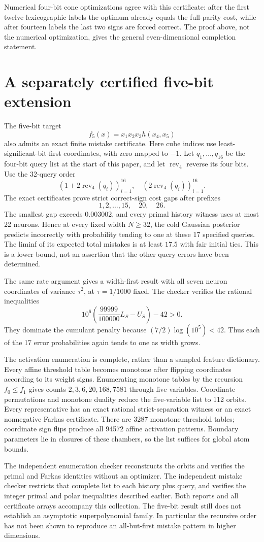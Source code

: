\documentclass[11pt]{article}
\begin{document}
Numerical four-bit cone optimizations agree with this certificate: after
the first twelve lexicographic labels the optimum already equals the
full-parity cost, while after fourteen labels the last two signs are
forced correct. The proof above, not the numerical optimization, gives
the general even-dimensional completion statement.

\section{A separately certified five-bit extension}
The five-bit target
\[
 f_5(x)=x_1x_2x_3h(x_4,x_5)
\]
also admits an exact finite mistake certificate. Here cube indices use
least-significant-bit-first coordinates, with zero mapped to $-1$.
Let $q_1,\ldots,q_{16}$ be the four-bit query list at the start of this
paper, and let $\operatorname{rev}_4$ reverse its four bits. Use the
32-query order
\[
 (1+2\operatorname{rev}_4(q_i))_{i=1}^{16},\quad
 (2\operatorname{rev}_4(q_i))_{i=1}^{16}.
\]
The exact certificates prove strict correct-sign cost gaps after
prefixes
\[
                  1,2,\ldots,15,\quad20,\quad26.
\]
The smallest gap exceeds $0.003002$, and every primal history witness
uses at most 22 neurons. Hence at every fixed width $N\ge32$, the
cold Gaussian posterior predicts incorrectly with probability tending
to one at these 17 specified queries. The liminf of its expected total
mistakes is at least $17.5$ with fair initial ties. This is a lower
bound, not an assertion that the other query errors have been determined.

The same rate argument gives a width-first result with all seven neuron
coordinates of variance $\tau^2$, at $\tau=1/1000$ fixed. The checker
verifies the rational inequalities
\[
 10^6\left(\frac{99999}{100000}L_S-U_S\right)-42>0.
\]
They dominate the cumulant penalty because
$(7/2)\log(10^5)<42$. Thus each of the 17 error probabilities again
tends to one as width grows.

The activation enumeration is complete, rather than a sampled feature
dictionary. Every affine threshold table becomes monotone after flipping
coordinates according to its weight signs. Enumerating monotone tables
by the recursion $f_0\le f_1$ gives counts
$2,3,6,20,168,7581$ through five variables. Coordinate permutations
and monotone duality reduce the five-variable list to 112 orbits.
Every representative has an exact rational strict-separation witness
or an exact nonnegative Farkas certificate. There are 3287 monotone
threshold tables; coordinate sign flips produce all 94572 affine
activation patterns. Boundary parameters lie in closures of these
chambers, so the list suffices for global atom bounds.

The independent enumeration checker reconstructs the orbits and verifies
the primal and Farkas identities without an optimizer. The independent
mistake checker restricts that complete list to each history plus query,
and verifies the integer primal and polar inequalities described earlier.
Both reports and all certificate arrays accompany this collection.
The five-bit result still does not establish an asymptotic
superpolynomial family. In particular the recursive order has not been
shown to reproduce an all-but-first mistake pattern in higher dimensions.
\end{document}
